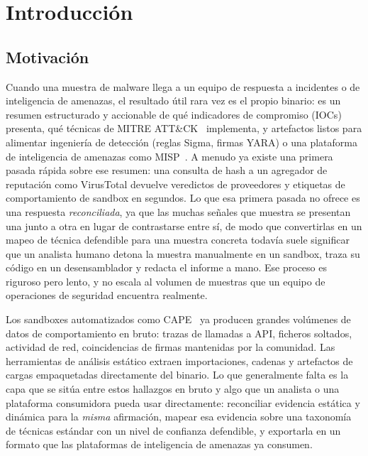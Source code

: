 \section{Introducci\'on}
\label{sec:introduction}

\subsection{Motivaci\'on}

Cuando una muestra de malware llega a un equipo de respuesta a
incidentes o de inteligencia de amenazas, el resultado \'util rara vez
es el propio binario: es un resumen estructurado y accionable de qu\'e
indicadores de compromiso (IOCs) presenta, qu\'e t\'ecnicas de
MITRE ATT\&CK~\cite{mitre-attack} implementa, y artefactos listos para
alimentar ingenier\'ia de detecci\'on (reglas Sigma, firmas YARA) o una
plataforma de inteligencia de amenazas como MISP~\cite{misp}. A menudo
ya existe una primera pasada r\'apida sobre ese resumen: una consulta
de hash a un agregador de reputaci\'on como VirusTotal devuelve
veredictos de proveedores y etiquetas de comportamiento de sandbox en
segundos. Lo que esa primera pasada no ofrece es una respuesta
\emph{reconciliada}, ya que las muchas se\~nales que muestra se
presentan una junto a otra en lugar de contrastarse entre s\'i, de
modo que convertirlas en un mapeo de t\'ecnica defendible para una
muestra concreta todav\'ia suele significar que un analista humano
detona la muestra manualmente en un sandbox, traza su c\'odigo en un
desensamblador y redacta el informe a mano. Ese proceso es riguroso
pero lento, y no escala al volumen de muestras que un equipo de
operaciones de seguridad encuentra realmente.

Los sandboxes automatizados como CAPE~\cite{cape} ya producen grandes
vol\'umenes de datos de comportamiento en bruto: trazas de llamadas a
API, ficheros soltados, actividad de red, coincidencias de firmas
mantenidas por la comunidad. Las herramientas de an\'alisis est\'atico
extraen importaciones, cadenas y artefactos de cargas empaquetadas
directamente del binario. Lo que generalmente falta es la capa que se
sit\'ua entre estos hallazgos en bruto y algo que un analista o una
plataforma consumidora pueda usar directamente: reconciliar evidencia
est\'atica y din\'amica para la \emph{misma} afirmaci\'on, mapear esa
evidencia sobre una taxonom\'ia de t\'ecnicas est\'andar con un nivel de
confianza defendible, y exportarla en un formato que las plataformas de
inteligencia de amenazas ya consumen.

